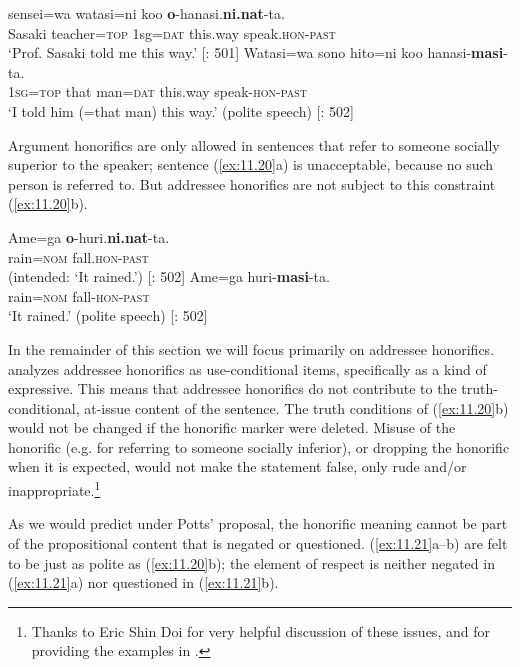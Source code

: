 \ea \label{ex:11.19}
\ea   {}  sensei=wa  watasi=ni  koo  \textbf{o}-hanasi.\textbf{ni.nat}-ta.\\
{Sasaki}  teacher=\textsc{top}  1sg=\textsc{dat}  this.way  speak.\textsc{hon-past}\\
\glt ‘Prof. {Sasaki} told me this way.’  [\citealt{Harada1976}: 501]
\ex \gll
    Watasi=wa  sono  hito=ni  koo  hanasi-\textbf{masi}-ta.\\
\textsc{1sg}=\textsc{top}  that  man=\textsc{dat}  this.way  speak-\textsc{hon-past}\\
\glt ‘I told him (=that man) this way.’  (polite speech)   [\citealt{Harada1976}: 502]
\z \z


Argument honorifics are only allowed in sentences that refer to someone socially superior to the speaker; sentence (\ref{ex:11.20}a) is unacceptable, because no such person is referred to. But addressee honorifics are not subject to this constraint (\ref{ex:11.20}b).


\ea \label{ex:11.20} \ea  \gll *Ame=ga  \textbf{o}-huri.\textbf{ni.nat}-ta.\\
  rain=\textsc{nom}  fall.\textsc{hon-past}\\
\glt (intended: ‘It rained.’)  [\citealt{Harada1976}: 502]
\ex \gll
Ame=ga  huri-\textbf{masi}-ta.\\
rain=\textsc{nom}  fall-\textsc{hon-past}\\
\glt ‘It rained.’  (polite speech)   [\citealt{Harada1976}: 502]
\z \z


In the remainder of this section we will focus primarily on addressee honorifics. \citet{Potts2005} analyzes addressee honorifics as use-conditional items, specifically as a kind of expressive. This means that addressee honorifics do not contribute to the truth-conditional, at-issue content of the sentence. The truth conditions of (\ref{ex:11.20}b) would not be changed if the honorific marker were deleted. Misuse of the honorific (e.g. for referring to someone socially inferior), or dropping the honorific when it is expected, would not make the statement false, only rude and/or inappropriate.\footnote{Thanks to Eric Shin Doi for very helpful discussion of these issues, and for providing the examples in .}



As we would predict under Potts’ proposal, the honorific meaning cannot be part of the propositional content that is negated or questioned. (\ref{ex:11.21}a--b) are felt to be just as polite as (\ref{ex:11.20}b); the element of respect is neither negated in (\ref{ex:11.21}a) nor questioned in (\ref{ex:11.21}b).


